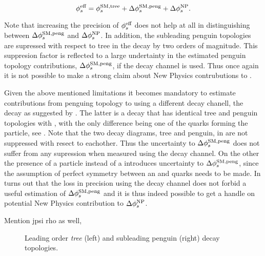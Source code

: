 \begin{equation}
\centering
 \phis^{\text {eff}} = \phis^{\tiny \text{SM,tree}} + \Delta\phiS{SM,peng} + \Delta\phis^{\tiny \text{NP}}.
 \label{app_phis_sm_peng}
\end{equation}

\noindent Note that increasing the precision of $\phi_{s}^{\text {eff}}$ does not help at all in distinguishing
between $\Delta\phi_{s}^{\tiny\text{SM,peng}}$ and $\Delta\phi_{s}^{\tiny \text{NP}}$. In addition, the subleading penguin
topologies are supressed with respect to tree in the \BsJpsiPhi decay by two orders of magnitude.
This suppresion factor is reflected to a large undertainty in the estimated penguin topology contributions,
$\Delta\phi_{s}^{\tiny\text{SM,peng}}$, if the \BsJpsiPhi decay channel is used. Thus once again it is not possible to
make a strong claim about New Physics contrubutions to \phis.

Given the above mentioned limitations it becomes mandatory to estimate contributions from
penguing topology to \phis using a different decay chanell, \eg the \BsJpsiKst decay as suggested by
\cite{}\cite{}. The latter is a decay that has identical tree and penguin topologies with \BsJpsiPhi,
with the only difference being one of the quarks forming the \Pphi particle, see .
Note that the two decay diagrams, tree and penguin, in \BsJpsiKst are not suppressed with resect to eachother.
Thus the uncertainty to $\Delta\phi_{s}^{\tiny\text{SM,peng}}$ does not suffer from any supression when measured using the
\BsJpsiKst decay channel. On the other the presence of a \Kstarz particle instead of a \Pphi introduces
uncertainty to $\Delta\phi_{s}^{\tiny\text{SM,peng}}$, since the assumption of perfect symmetry between an \squark and \dquark quarks
needs to be made. In turns out that the loss in precision using the \BsJpsiKst decay channel does not
forbid a useful estimation of $\Delta\phi_{s}^{\tiny\text{SM,peng}}$ and it is thus indeed possible to get a handle on
potential New Physics contribution to $\Delta\phi_{s}^{\tiny \text{NP}}$.

{\color{red} Mention jpsi rho as well, }

\begin{figure}[t]
  \begin{subfigure}{0.5\textwidth}
    \raggedright
    {\scalebox{1}{\sffamily }}
    \label{app_jpsiphi_tree}
  \end{subfigure}%
  \hfill
  \begin{subfigure}{0.5\textwidth}
    \raggedleft
    {\scalebox{1}{\sffamily }}
    \label{app_jpsiphi_peng}
  \end{subfigure}
    \caption{Leading order {\it tree} (left) and subleading penguin (right) \BsJpsiPhi decay topologies.}
  \label{app_jpsiphi_tree_peng}
\end{figure}

